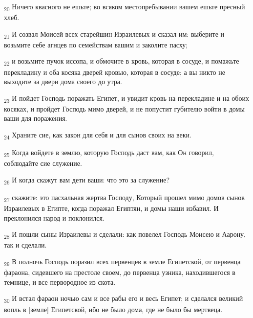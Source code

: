 \begin{tcolorbox}
\textsubscript{20} Ничего квасного не ешьте; во всяком местопребывании вашем ешьте пресный хлеб.
\end{tcolorbox}
\begin{tcolorbox}
\textsubscript{21} И созвал Моисей всех старейшин Израилевых и сказал им: выберите и возьмите себе агнцев по семействам вашим и заколите пасху;
\end{tcolorbox}
\begin{tcolorbox}
\textsubscript{22} и возьмите пучок иссопа, и обмочите в кровь, которая в сосуде, и помажьте перекладину и оба косяка дверей кровью, которая в сосуде; а вы никто не выходите за двери дома своего до утра.
\end{tcolorbox}
\begin{tcolorbox}
\textsubscript{23} И пойдет Господь поражать Египет, и увидит кровь на перекладине и на обоих косяках, и пройдет Господь мимо дверей, и не попустит губителю войти в домы ваши для поражения.
\end{tcolorbox}
\begin{tcolorbox}
\textsubscript{24} Храните сие, как закон для себя и для сынов своих на веки.
\end{tcolorbox}
\begin{tcolorbox}
\textsubscript{25} Когда войдете в землю, которую Господь даст вам, как Он говорил, соблюдайте сие служение.
\end{tcolorbox}
\begin{tcolorbox}
\textsubscript{26} И когда скажут вам дети ваши: что это за служение?
\end{tcolorbox}
\begin{tcolorbox}
\textsubscript{27} скажите: это пасхальная жертва Господу, Который прошел мимо домов сынов Израилевых в Египте, когда поражал Египтян, и домы наши избавил. И преклонился народ и поклонился.
\end{tcolorbox}
\begin{tcolorbox}
\textsubscript{28} И пошли сыны Израилевы и сделали: как повелел Господь Моисею и Аарону, так и сделали.
\end{tcolorbox}
\begin{tcolorbox}
\textsubscript{29} В полночь Господь поразил всех первенцев в земле Египетской, от первенца фараона, сидевшего на престоле своем, до первенца узника, находившегося в темнице, и все первородное из скота.
\end{tcolorbox}
\begin{tcolorbox}
\textsubscript{30} И встал фараон ночью сам и все рабы его и весь Египет; и сделался великий вопль в [земле] Египетской, ибо не было дома, где не было бы мертвеца.
\end{tcolorbox}
